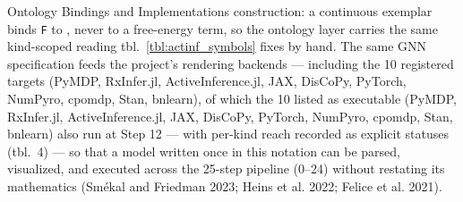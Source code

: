 \documentclass[
  ignorenonframetext,
]{beamer}
\begin{document}
\begin{frame}{Ontology Bindings and
Implementations}
construction: a continuous exemplar binds \texttt{F} to
, never to a free-energy term, so the
ontology layer carries the same kind-scoped reading
tbl.~\ref{tbl:actinf_symbols} fixes by hand. The same GNN specification
feeds the project's rendering backends --- including the 10 registered
targets (PyMDP, RxInfer.jl, ActiveInference.jl, JAX, DisCoPy, PyTorch,
NumPyro, cpomdp, Stan, bnlearn), of which the 10 listed as executable
(PyMDP, RxInfer.jl, ActiveInference.jl, JAX, DisCoPy, PyTorch, NumPyro,
cpomdp, Stan, bnlearn) also run at Step 12 --- with per-kind reach
recorded as explicit statuses (tbl.~4) ---
so that a model written once in this notation can be parsed, visualized,
and executed across the 25-step pipeline (0--24) without restating its
mathematics (Smékal and Friedman 2023; Heins et al. 2022; Felice et al.
2021).
\end{frame}
\end{document}
